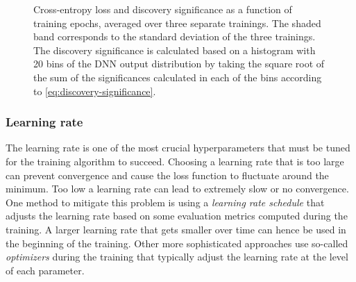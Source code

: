 \begin{figure}[t]
    \caption{Cross-entropy loss and discovery significance as a function of training epochs, averaged over three separate trainings. The shaded band corresponds to the standard deviation of the three trainings. The discovery significance is calculated based on a histogram with 20 bins of the DNN output distribution by taking the square root of the sum of the significances calculated in each of the bins according to \cref{eq:discovery-significance}.}
    \label{fig:loss-vs-sign}
\end{figure}

\subsubsection{Learning rate}
The learning rate is one of the most crucial hyperparameters that must be tuned for the training algorithm to succeed. Choosing a learning rate that is too large can prevent convergence and cause the loss function to fluctuate around the minimum. Too low a learning rate can lead to extremely slow or no convergence. 
One method to mitigate this problem is using a \emph{learning rate schedule} that adjusts the learning rate based on some evaluation metrics computed during the training. A larger learning rate that gets smaller over time can hence be used in the beginning of the training. 
Other more sophisticated approaches use so-called \emph{optimizers} during the training that typically adjust the learning rate at the level of each parameter.


